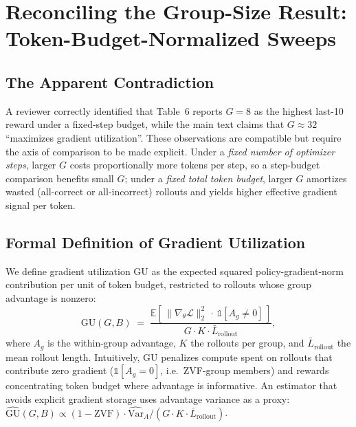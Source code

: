 \section{Reconciling the Group-Size Result: Token-Budget-Normalized Sweeps}
\label{sec:appendix:group-size-reconcile}

\subsection{The Apparent Contradiction}

A reviewer correctly identified that Table~6 reports $G{=}8$ as the
highest last-10 reward under a fixed-step budget, while the main text
claims that $G{\approx}32$ ``maximizes gradient utilization''. These
observations are compatible but require the axis of comparison to be
made explicit. Under a \emph{fixed number of optimizer steps}, larger
$G$ costs proportionally more tokens per step, so a step-budget
comparison benefits small $G$; under a \emph{fixed total token budget},
larger $G$ amortizes wasted (all-correct or all-incorrect) rollouts
and yields higher effective gradient signal per token.

\subsection{Formal Definition of Gradient Utilization}

We define gradient utilization $\mathrm{GU}$ as the expected squared
policy-gradient-norm contribution per unit of token budget, restricted
to rollouts whose group advantage is nonzero:
\begin{equation}
\label{eq:gu}
\mathrm{GU}(G, B) \;=\;
\frac{\displaystyle\mathbb{E}\!\left[\,\|\nabla_\theta \mathcal{L}\|_2^{2}\,\cdot\,
  \mathbb{1}\!\left[A_g \ne 0\right]\,\right]}
{\displaystyle G \cdot K \cdot \bar{L}_\text{rollout}},
\end{equation}
where $A_g$ is the within-group advantage, $K$ the rollouts per group,
and $\bar{L}_\text{rollout}$ the mean rollout length.
Intuitively, $\mathrm{GU}$ penalizes compute spent on rollouts that
contribute zero gradient ($\mathbb{1}[A_g\!=\!0]$, i.e.~ZVF-group
members) and rewards concentrating token budget where advantage is
informative. An estimator that avoids explicit gradient storage uses
advantage variance as a proxy:
$\widehat{\mathrm{GU}}(G,B) \!\propto\!
 (1 - \mathrm{ZVF}) \cdot \widehat{\mathrm{Var}}_A / (G\cdot K \cdot \bar{L}_\text{rollout})$.

